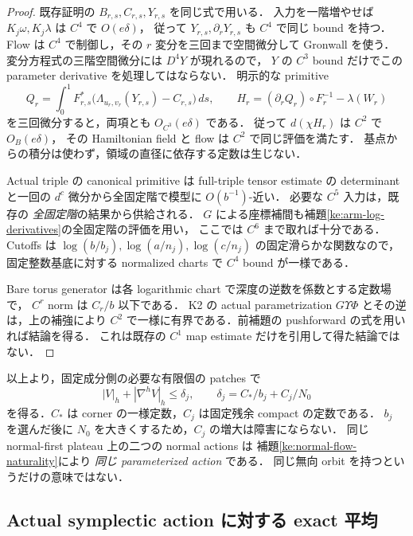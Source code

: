 \begin{proof}
既存証明の $B_{r,s},C_{r,s},Y_{r,s}$ を同じ式で用いる．
入力を一階増やせば $K_j\omega,K_j\lambda$ は $C^4$ で $O(e\delta)$，
従って $Y_{r,s},\partial_rY_{r,s}$ も $C^4$ で同じ bound を持つ．
Flow は $C^4$ で制御し，その $r$ 変分を三回まで空間微分して Gronwall を使う．
変分方程式の三階空間微分には $D^4Y$ が現れるので，
$Y$ の $C^3$ bound だけでこの parameter derivative を処理してはならない．
明示的な primitive
\[
 Q_r=\int_0^1F_{r,s}^*
       \bigl(\Lambda_{u_r,v_r}(Y_{r,s})-C_{r,s}\bigr)\,ds,
 \qquad
 H_r=(\partial_rQ_r)\circ F_r^{-1}-\lambda(W_r)
\]
を三回微分すると，両項とも $O_{C^3}(e\delta)$ である．
従って $d(\chi H_r)$ は $C^2$ で $O_B(e\delta)$，
その Hamiltonian field と flow は $C^2$ で同じ評価を満たす．
基点からの積分は使わず，領域の直径に依存する定数は生じない．

Actual triple の canonical primitive は full-triple tensor estimate の
determinant と一回の $d^c$ 微分から全固定階で模型に $O(b^{-1})$-近い．
必要な $C^5$ 入力は，既存の \emph{全固定階}の結果から供給される．
$G$ による座標補間も補題\ref{ke:arm-log-derivatives}の全固定階の評価を用い，
ここでは $C^6$ まで取れば十分である．
Cutoffs は $\log(b/b_j),\log(a/n_j),\log(c/n_j)$ の固定滑らかな関数なので，
固定整数基底に対する normalized charts で $C^4$ bound が一様である．

Bare torus generator は各 logarithmic chart で深度の逆数を係数とする定数場で，
$C^r$ norm は $C_r/b$ 以下である．
K2 の actual parametrization $G\Upsilon\Phi$ とその逆は，上の補強により
$C^2$ で一様に有界である．前補題の pushforward の式を用いれば結論を得る．
これは既存の $C^1$ map estimate だけを引用して得た結論ではない．
\end{proof}

以上より，固定成分側の必要な有限個の patches で
\begin{equation}\label{ke:eq:actual-generator-delta}
 |V|_h+|\nabla^hV|_h\le\delta_j,
 \qquad \delta_j=C_*/b_j+C_j/N_0
\end{equation}
を得る．$C_*$ は corner の一様定数，$C_j$ は固定残余 compact の定数である．
$b_j$ を選んだ後に $N_0$ を大きくするため，$C_j$ の増大は障害にならない．
同じ normal-first plateau 上の二つの normal actions は
補題\ref{ke:normal-flow-naturality}により \emph{同じ parameterized action} である．
同じ無向 orbit を持つというだけの意味ではない．

\subsection{Actual symplectic action に対する exact 平均}

